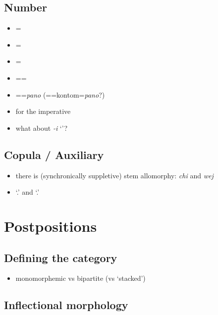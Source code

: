 \documentclass{memoir}
\begin{document}
\section{\texorpdfstring{Number \label{sec:verbalnumber}}{Number }}

\begin{itemize}
\tightlist
\item
  =
\item
  =
\item
  =
\item
  ==
\item
  ==\emph{pano}
  (==kontom=\emph{pano}?)
\item
   for the imperative
\item
  what about \emph{-i} `'?
\end{itemize}

\section{Copula / Auxiliary}

\begin{itemize}
\tightlist
\item
  there is (synchronically suppletive) stem allomorphy: \emph{chi} and
  \emph{wej}
\item
   `.' and  `.'
\end{itemize}

\chapter{\texorpdfstring{Postpositions \label{postp}}{Postpositions }}

\section{Defining the category}

\begin{itemize}
\tightlist
\item
  monomorphemic vs bipartite (vs `stacked')
\end{itemize}

\section{\texorpdfstring{Inflectional morphology
\label{sec:postinfl}}{Inflectional morphology }}
\end{document}

